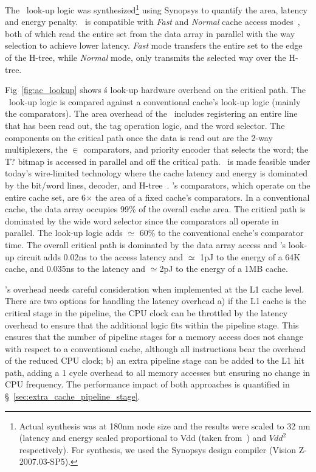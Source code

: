 

The \AC\ look-up logic was synthesized\footnote{Actual synthesis was at 180nm node size and the results were scaled to 32 nm (latency and energy scaled proportional to Vdd (taken from~\cite{Danowitz:2012:CDR:2133806.2133822}) and $Vdd^2$ respectively). For synthesis, we used the Synopsys design compiler (Vision Z-2007.03-SP5).} using Synopsys to quantify the area, latency and energy penalty. \AC\ is compatible with  \textit{Fast} and \textit{Normal} cache access modes~\cite{Muralimanohar:2007:ONO:1331699.1331704}, both of which read the entire set from the data array in parallel with the way selection to  achieve lower latency. \textit{Fast} mode transfers the entire set to the edge of the H-tree, while \textit{Normal} mode, only transmits the selected way over the H-tree. 

Fig~\ref{fig:ac_lookup} shows \AC\'s look-up hardware overhead on the critical path. The \AC\ look-up logic is compared against a conventional cache's look-up logic (mainly the comparators). The area overhead of the \AC\ includes registering an entire line that has been read out, the tag operation logic, and the word selector. The components on the critical path once the data is read out are the 2-way multiplexers, the $\in$ comparators, and priority encoder that selects the word; the T?  bitmap is accessed in parallel and off the critical path. \AC\ is made feasible under today's wire-limited technology where the cache latency and energy is dominated by the bit/word lines, decoder, and H-tree~\cite{Muralimanohar:2007:ONO:1331699.1331704}. \AC{}'s comparators, which operate on the entire cache set, are 6$\times$ the area of a fixed cache's comparators. In a conventional cache, the data array occupies 99\% of the overall cache area. The critical path is dominated by the wide word selector since the comparators all operate in parallel. The look-up logic adds $\simeq$ 60\% to the conventional cache's comparator time. The overall critical path is dominated by the data array access and \AC{}'s look-up circuit adds 0.02ns to the access latency and $\simeq$ 1pJ to the energy of a 64K cache, and 0.035ns to the latency and $\simeq$2pJ to the energy of a 1MB cache. 

\AC{}'s overhead needs careful consideration when implemented at the L1 cache level. There are two options for handling the latency overhead a) if the L1 cache is the critical stage in the pipeline, the CPU clock can be throttled by the latency overhead to ensure that the additional logic fits within the pipeline stage. This ensures that the number of pipeline stages for a memory access does not change with respect to a conventional cache, although all instructions bear the overhead of the reduced CPU clock; b) an extra pipeline stage can be added to the L1 hit path, adding a 1 cycle overhead to all memory accesses but ensuring no change in CPU frequency. The performance impact of both approaches is quantified in \S~\ref{sec:extra_cache_pipeline_stage}.


